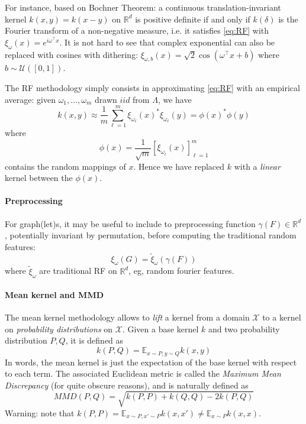 \documentclass{article}
\begin{document}
For instance, based on Bochner Theorem: a continuous translation-invariant kernel $k(x,y)=k(x-y)$ on $\mathbb{R}^d$ is positive
definite if and only if $k(\delta)$ is the Fourier transform of a non-negative measure, i.e. it satisfies \eqref{eq:RF} with $\xi_\omega(x) = e^{i\omega^\top x}$. It is not hard to see that complex exponential can also be replaced with cosines with dithering: $\xi_{\omega, b}(x) = \sqrt{2}\cos(\omega^\top x + b)$ where $b \sim \mathcal{U}([0,1])$.

The RF methodology simply consists in approximating \eqref{eq:RF} with an empirical average: given $\omega_1, \ldots, \omega_m$ drawn $iid$ from $\Lambda$, we have
\begin{equation}\label{eq:RF_approx}
k(x,y) \approx \frac{1}{m}\sum_{\ell=1}^m \xi_{\omega_\ell}(x)^* \xi_{\omega_\ell}(y) = \phi(x)^* \phi(y)
\end{equation}
where
\[
\phi(x) = \frac{1}{\sqrt{m}}\left[\xi_{\omega_\ell}(x)\right]_{\ell=1}^m
\]
contains the random mappings of $x$. Hence we have replaced $k$ with a \emph{linear} kernel between the $\phi(x)$.

\paragraph{Preprocessing} For graph(let)s, it may be useful to include to preprocessing function $\gamma(F) \in \mathbb{R}^d$, potentially invariant by permutation, before computing the traditional random features:
\[
\xi_\omega(G) = \tilde\xi_\omega(\gamma(F))
\]
where $\tilde\xi_\omega$ are traditional RF on $\mathbb{R}^d$, eg, random fourier features.

\paragraph{Mean kernel and MMD} The mean kernel methodology allows to \emph{lift} a kernel from a domain $\mathcal{X}$ to a kernel on \emph{probability distributions} on $\mathcal{X}$. Given a base kernel $k$ and two probability distribution $P,Q$, it is defined as
\begin{equation}\label{eq:mean_kernel}
k(P,Q) = \mathbb{E}_{x \sim P, y \sim Q} k(x,y)
\end{equation}
In words, the mean kernel is just the expectation of the base kernel with respect to each term. The associated Euclidean metric is called the \emph{Maximum Mean Discrepancy} (for quite obscure reasons), and is naturally defined as
\begin{equation}\label{eq:MMD}
MMD(P,Q) = \sqrt{k(P,P) + k(Q,Q) - 2k(P,Q)}
\end{equation}
Warning: note that $k(P,P) = \mathbb{E}_{x \sim P, x' \sim P} k(x,x') \neq \mathbb{E}_{x \sim P} k(x,x)$.
\end{document}
